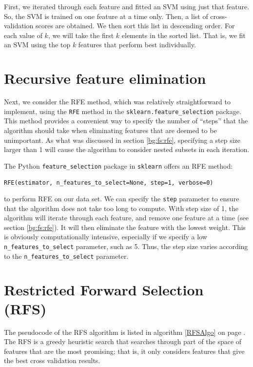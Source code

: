 \documentclass[12pt, twoside, a4paper]{report}
\begin{document}
First, we iterated through each feature and fitted an SVM using just that feature. So, the SVM is trained on one feature at a time only. Then, a list of cross-validation scores are obtained. We then sort this list in descending order. For each value of $k$, we will take the first $k$ elements in the sorted list. That is, we fit an SVM using the top $k$ features that perform best individually.

\section{Recursive feature elimination} \label{body:rfe}

Next, we consider the RFE method, which was relatively straightforward to implement, using the \texttt{RFE} method in the \texttt{sklearn.feature\_selection} package. This method provides a convenient way to specify the number of ``steps'' that the algorithm should take when eliminating features that are deemed to be unimportant. As what was discussed in section \ref{bg:fs:rfe}, specifying a step size larger than 1 will cause the algorithm to consider nested subsets in each iteration.

The Python \texttt{feature\_selection} package in \texttt{sklearn} offers an RFE method:
\begin{center}
\texttt{RFE(estimator, n\_features\_to\_select=None, step=1, verbose=0)}
\end{center}

to perform RFE on our data set. We can specify the \texttt{step} parameter to ensure that the algorithm does not take too long to compute. With step size of 1, the algorithm will iterate through each feature, and remove one feature at a time (see section \ref{bg:fs:rfe}). It will then eliminate the feature with the lowest weight. This is obviously computationally intensive, especially if we specify a low \texttt{n\_features\_to\_select} parameter, such as 5. Thus, the step size varies according to the \texttt{n\_features\_to\_select} parameter.

\section{Restricted Forward Selection (RFS)} \label{body:rfs}

The pseudocode of the RFS algorithm \cite{deng1998omega} is listed in algorithm \ref{RFSAlgo} on page \pageref{RFSAlgo}. The RFS is a greedy heuristic search that searches through part of the space of features that are the most promising; that is, it only considers features that give the best cross validation results.
\end{document}
